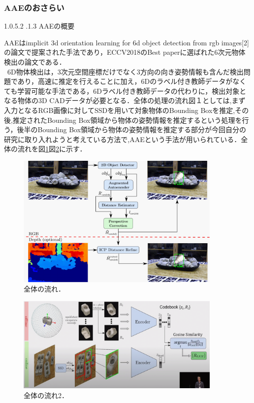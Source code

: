 \documentclass[11pt,a4j,ascmac]{jarticle}
\makeatletter
\newcommand{\subsubsubsection}{\@startsection{paragraph}{4}{\z@}%
  {1.0\Cvs \@plus.5\Cdp \@minus.2\Cdp}%
  {.1\Cvs \@plus.3\Cdp}%
  {\reset@font\sffamily\normalsize}
}
\makeatother
\begin{document}
\subsubsection{AAEのおさらい}
\subsubsubsection{AAEの概要}

\quad AAEはimplicit 3d orientation learning for 6d object detection from rgb images[2] の論文で提案された手法であり，ECCV2018のBest paperに選ばれた6次元物体検出の論文である．\\
\ 6D物体検出は，3次元空間座標だけでなく3方向の向き姿勢情報も含んだ検出問題であり，高速に推定を行えることに加え，6Dのラベル付き教師データがなくても学習可能な手法である，6Dラベル付き教師データの代わりに，検出対象となる物体の3D CADデータが必要となる．全体の処理の流れ図１としては,まず入力となるRGB画像に対してSSDを用いて対象物体のBounding Boxを推定,その後,推定されたBounding Box領域から物体の姿勢情報を推定するという処理を行う，後半のBounding Box領域から物体の姿勢情報を推定する部分が今回自分の研究に取り入れようと考えている方法で,AAEという手法が用いられている．全体の流れを図\ref{fig:style1}図\ref{fig:style2}に示す．\\   
      \begin{figure}[htpp]
      \centering
      \includegraphics[width=100mm]{pic1.eps}
      \vspace*{15mm}
      \caption{全体の流れ．}
      \label{fig:style1}
      \end{figure}

      \begin{figure}[htpp]
      \centering
      \includegraphics[width=100mm]{pic3.eps}
      \vspace*{25mm}
      \caption{全体の流れ2．}
      \label{fig:style2}
      \end{figure}
\end{document}
